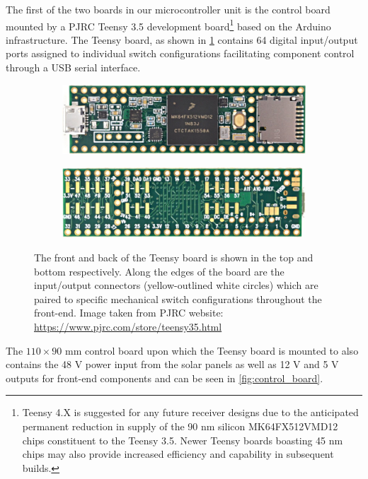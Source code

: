 The first of the two boards in our microcontroller unit is the control board mounted by a PJRC Teensy 3.5 development board\footnote{Teensy 4.X is suggested for any future receiver designs due to the anticipated permanent reduction in supply of the 90 nm silicon MK64FX512VMD12 chips constituent to the Teensy 3.5. Newer Teensy boards boasting 45 nm chips may also provide increased efficiency and capability in subsequent builds.} based on the Arduino infrastructure. The Teensy board, as shown in \cref{fig:teensy} contains 64 digital input/output ports assigned to individual switch configurations facilitating component control through a USB serial interface.
\begin{figure}[t]
    \centering
    \begin{subfigure}{0.5\textwidth}
        \includegraphics[width=\textwidth]{teensy_top}
    \end{subfigure}
    \begin{subfigure}{0.5\textwidth}
        \includegraphics[width=\textwidth]{teensy_bottom}
    \end{subfigure}
    \caption{The front and back of the Teensy board is shown in the top and bottom respectively. Along the edges of the board are the input/output connectors (yellow-outlined white circles) which are paired to specific mechanical switch configurations throughout the front-end. Image taken from PJRC website: \url{https://www.pjrc.com/store/teensy35.html}}
    \label{fig:teensy}
\end{figure}
The $110 \times 90$ mm control board upon which the Teensy board is mounted to also contains the 48 V power input from the solar panels as well as 12 V and 5 V outputs for front-end components and can be seen in \cref{fig:control_board}.
